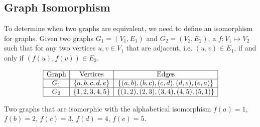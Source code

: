 \subsection{Graph Isomorphism}
To determine when two graphs are equivalent, we need to define an isomorphism for graphs.  Given 
two graphs $G_1 =(V_1,E_1)$ and $G_2 = (V_2,E_2) $, a  $f: V_1 \mapsto 
V_2$ 
such that for any two vertices $u,v \in V_1$ that are adjacent, i.e. $(u, v) \in E_1$, if and only 
if $(f(u),f(v)) \in E_2$. 
\begin{table}[!ht]
\begin{center}
$$\begin{array}{|c|c|c|}\hline
\text{Graph}&\text{Vertices}&\text{Edges}\\\hline
G_1&\left\lbrace a,b,c,d,e \right\rbrace & \left\lbrace (a,b),(b,c),(c,d),(d,e),(e,a) \right\rbrace 
\\\hline
G_2&\left\lbrace 1,2,3,4,5 \right\rbrace & \left\lbrace (1,2),(2,3),(3,4),(4,5),(5,1) \right\rbrace 
\\\hline
\end{array} $$
\caption{Two graphs that are isomorphic with the alphabetical isomorphism $f(a)=1$, $f(b)=2$, $f(c) 
= 3$, $f(d)=4$, $f(e)=5$.}
\end{center} 
\label{table:ch1-graph-1}
\end{table}
